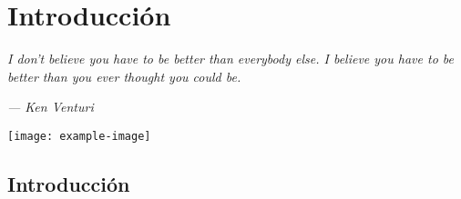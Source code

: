 \newpage 
\chapter*{Introducción}
\epigraph{\textit{I don't believe you have to be better than everybody else. I believe you have to be better than you ever thought you could be.
 		}}{\textit{— Ken Venturi}}
		\vspace*{8cm}
\begin{center}
	 \centering
	\texttt{[image: example-image]}
\end{center}
\thispagestyle{empty}
\newpage
\vspace*{2cm}
\section*{Introducción}
\blindtext[1]
\blindmathpaper \blindmathpaper

\thispagestyle{empty}	
